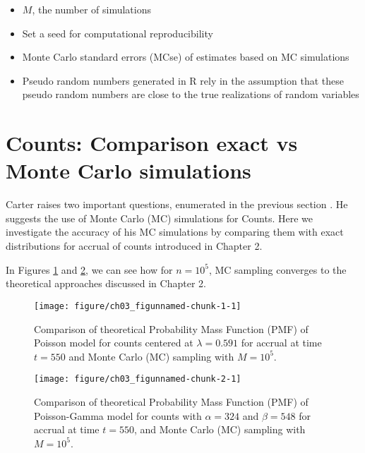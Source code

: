 \begin{itemize}
\item $M$, the number of simulations
\item Set a seed for computational reproducibility
\item Monte Carlo standard errors (MCse) of estimates based on MC simulations
\item Pseudo random numbers generated in R rely in the assumption that these pseudo random numbers are close to the true realizations of random variables \citep{held2014applied}
\end{itemize}
\section{Counts: Comparison exact vs Monte Carlo simulations}

Carter raises two important questions, enumerated in the previous section \citep{carter2004application, carter2005practical}. He suggests the use of Monte Carlo (MC) simulations for Counts. Here we investigate the accuracy of his MC simulations by comparing them with exact distributions for accrual of counts introduced in Chapter 2. 

In Figures \ref{fig:3_1} and \ref{fig:3_2}, we can see how for $n=10^5$, MC sampling converges to the theoretical approaches discussed in Chapter 2.
%
%
%
%
%


\begin{figure}
\begin{knitrout}
\color{fgcolor}
\texttt{[image: figure/ch03\_figunnamed-chunk-1-1]} 
\end{knitrout}
  \caption{Comparison of theoretical Probability Mass Function (PMF) of Poisson model for counts centered at $\lambda = 0.591$ for accrual at time $t=550$ and Monte Carlo (MC) sampling with $M=10^5$.}
  \label{fig:3_1}
\end{figure}



\begin{figure}
\begin{knitrout}
\color{fgcolor}
\texttt{[image: figure/ch03\_figunnamed-chunk-2-1]} 
\end{knitrout}
\caption{Comparison of theoretical Probability Mass Function (PMF) of Poisson-Gamma model for counts with $\alpha = 324$ and $\beta = 548$ for accrual at time $t=550$, and Monte Carlo (MC) sampling with $M=10^5$.}
\label{fig:3_2}
\end{figure}



